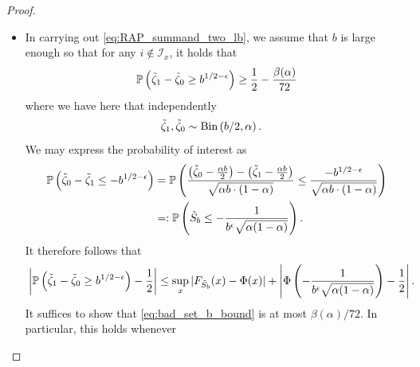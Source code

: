 \documentclass[11pt]{amsart}
\numberwithin{equation}{section}
\numberwithin{equation}{section}
\newcommand{\1}{\mathbbm{1}}
\newcommand{\Prob}{\mathbb{P}}
\newcommand{\Bin}{\textup{Bin}}
\theoremstyle{definition}
\begin{document}
\begin{appendices}
\begin{proof}
\begin{itemize}
        \begin{align*}
            \frac{b}{\left( \alpha b ( 1 -  \alpha) \right)^{3/2}} \leq \frac{\beta(\alpha)}{8} \iff \frac{64}{\alpha^3\beta(\alpha)^2(1-\alpha)^3} \leq b.
        \end{align*}
        On the other hand, since it readily follows from the Mean Value Theorem that $\Phi$ is $1$-Lipschitz, the latter condition of \eqref{eq:good_indices_two_bounds} is satisfied whenever
        \begin{align*}
            \frac{1}{b^\epsilon \sqrt{\alpha(1-\alpha)}} \leq \frac{\beta(\alpha)}{8} \iff \frac{8^{24}}{\alpha^{12}\beta(\alpha)^{24} (1-\alpha)^{12}} \leq b.
        \end{align*}
    
        \item In carrying out \eqref{eq:RAP_summand_two_lb}, we assume that $b$ is large enough so that for any $i \notin \mathcal I_x$, it holds that
        \begin{align*}
            \Prob\left( \Tilde{\zeta}_1 - \Tilde{\zeta}_0 \geq b^{1/2-\epsilon} \right) \geq \frac{1}{2} - \frac{\beta(\alpha)}{72}
        \end{align*}
        where we have here that independently
        \begin{align*}
            & \Tilde{\zeta}_1, \Tilde{\zeta}_0 \sim \Bin\left( b/2 , \alpha \right).
        \end{align*}
        We may express the probability of interest as
        \begin{align*}
            \Prob\left( \Tilde{\zeta}_0 - \Tilde{\zeta}_1 \leq -b^{1/2-\epsilon} \right) & = \Prob\left( \frac{\left( \Tilde{\zeta}_0-\frac{\alpha b}{2} \right) - \left( \Tilde{\zeta}_1-\frac{\alpha b}{2} \right)}{\sqrt{\alpha b \cdot (1-\alpha)}} \leq \frac{-b^{1/2-\epsilon}}{\sqrt{\alpha b \cdot (1-\alpha)}} \right) \\
            & =: \Prob\left( \Tilde{S}_b \leq -\frac{1}{b^\epsilon \sqrt{\alpha(1-\alpha)}} \right).
        \end{align*}
        It therefore follows that
        \begin{align} \label{eq:bad_set_b_bound}
            & \left| \Prob\left( \Tilde{\zeta}_1 - \Tilde{\zeta}_0 \geq b^{1/2-\epsilon} \right) - \frac{1}{2} \right| \leq \sup_x |F_{\Tilde{S}_b}(x) - \Phi(x)| + \left| \Phi\left( -\frac{1}{b^\epsilon \sqrt{\alpha(1-\alpha)}} \right) - \frac{1}{2} \right|.
        \end{align}
        It suffices to show that \eqref{eq:bad_set_b_bound} is at most $\beta(\alpha)/72$. In particular, this holds whenever

\end{itemize}
\end{proof}
\end{appendices}
\end{document}
